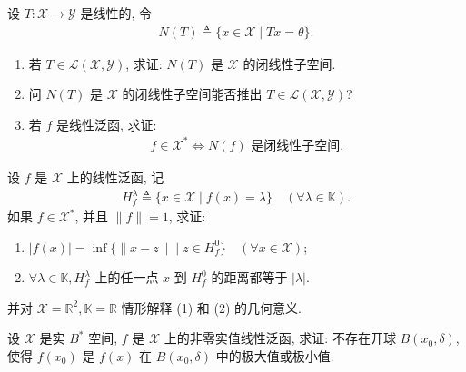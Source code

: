 \documentclass[../../main.tex]{subfiles}%
\begin{document}
\begin{proposition}\label{proposition:泛函分析--命题1.1231.31.3}
设 $T: \mathscr{X} \to \mathscr{Y}$ 是线性的, 令
\begin{align*}
N(T) \triangleq \{x \in \mathscr{X} \mid Tx = \theta\}.
\end{align*}
\begin{enumerate}[(1)]
\item\label{proposition:泛函分析--命题1.1231.31.3-1} 若 $T \in \mathscr{L}(\mathscr{X},\mathscr{Y})$, 求证: $N(T)$ 是 $\mathscr{X}$ 的闭线性子空间.

\item\label{proposition:泛函分析--命题1.1231.31.3-2} 问 $N(T)$ 是 $\mathscr{X}$ 的闭线性子空间能否推出 $T \in \mathscr{L}(\mathscr{X},\mathscr{Y})$?

\item\label{proposition:泛函分析--命题1.1231.31.3-3} 若 $f$ 是线性泛函, 求证:
\begin{align*}
f \in \mathscr{X}^* \iff N(f) \text{ 是闭线性子空间}.
\end{align*}
\end{enumerate}
\end{proposition}

\begin{example}
设 $f$ 是 $\mathscr{X}$ 上的线性泛函, 记
\begin{align*}
H_f^\lambda \triangleq \{x \in \mathscr{X} \mid f(x) = \lambda\} \quad (\forall \lambda \in \mathbb{K}).
\end{align*}
如果 $f \in \mathscr{X}^*$, 并且 $\|f\| = 1$, 求证:
\begin{enumerate}[(1)]
\item $|f(x)| = \inf \{\|x - z\| \mid z \in H_f^0\} \quad (\forall x \in \mathscr{X})$;
\item $\forall \lambda \in \mathbb{K}, H_f^\lambda$ 上的任一点 $x$ 到 $H_f^0$ 的距离都等于 $|\lambda|$.
\end{enumerate}
并对 $\mathscr{X} = \mathbb{R}^2, \mathbb{K} = \mathbb{R}$ 情形解释 (1) 和 (2) 的几何意义.
\end{example}

\begin{proposition}\label{proposition:泛函分析--例题2.1.9}
设 $\mathscr{X}$ 是实 $B^*$ 空间, $f$ 是 $\mathscr{X}$ 上的非零实值线性泛函, 求证: 不存在开球 $B(x_0, \delta)$, 使得 $f(x_0)$ 是 $f(x)$ 在 $B(x_0, \delta)$ 中的极大值或极小值.
\end{proposition}
\end{document}
